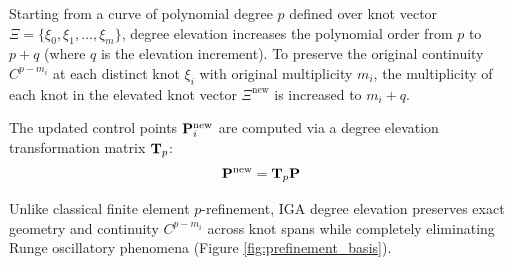 Starting from a curve of polynomial degree $p$ defined over knot vector $\Xi = \{\xi_0, \xi_1, \dots, \xi_m\}$, degree elevation increases the polynomial order from $p$ to $p+q$ (where $q$ is the elevation increment). To preserve the original continuity $C^{p-m_i}$ at each distinct knot $\xi_i$ with original multiplicity $m_i$, the multiplicity of each knot in the elevated knot vector $\Xi^{\text{new}}$ is increased to $m_i + q$.

The updated control points $\mathbf{P}_i^{\text{new}}$ are computed via a degree elevation transformation matrix $\mathbf{T}_p$:
\begin{equation}
    \mathbf{P}^{\text{new}} = \mathbf{T}_p \mathbf{P}
\end{equation}

Unlike classical finite element $p$-refinement, IGA degree elevation preserves exact geometry and continuity $C^{p-m_i}$ across knot spans while completely eliminating Runge oscillatory phenomena (Figure \ref{fig:prefinement_basis}).

